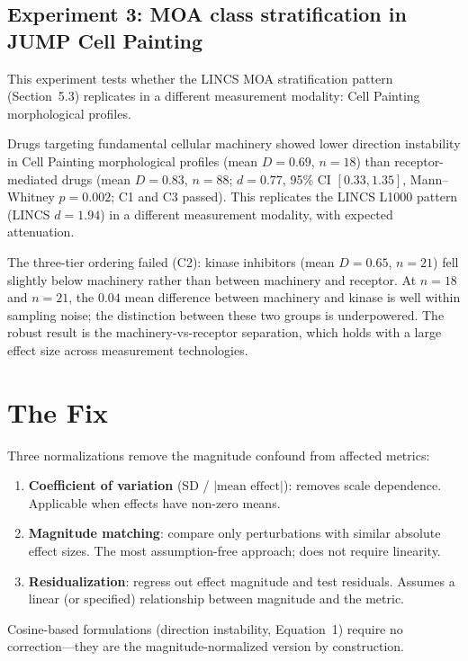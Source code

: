 \documentclass[11pt]{article}
\begin{document}
\subsection{Experiment 3: MOA class stratification in JUMP Cell Painting}

This experiment tests whether the LINCS MOA stratification pattern
(Section~5.3) replicates in a different measurement modality: Cell
Painting morphological profiles.

Drugs targeting fundamental cellular machinery showed lower direction
instability in Cell Painting morphological profiles (mean $D = 0.69$,
$n = 18$) than receptor-mediated drugs (mean $D = 0.83$, $n = 88$;
$d = 0.77$, 95\% CI $[0.33, 1.35]$, Mann--Whitney $p = 0.002$; C1 and C3 passed). This
replicates the LINCS L1000 pattern (LINCS $d = 1.94$) in a different
measurement modality, with expected attenuation.

The three-tier ordering failed (C2): kinase inhibitors (mean $D = 0.65$,
$n = 21$) fell slightly below machinery rather than between machinery
and receptor. At $n = 18$ and $n = 21$, the $0.04$ mean difference
between machinery and kinase is well within sampling noise; the
distinction between these two groups is underpowered. The robust result
is the machinery-vs-receptor separation, which holds with a large
effect size across measurement technologies.

\section{The Fix}

Three normalizations remove the magnitude confound from affected
metrics:

\begin{enumerate}
  \item \textbf{Coefficient of variation} (SD / $|\text{mean effect}|$):
    removes scale dependence. Applicable when effects have non-zero means.
  \item \textbf{Magnitude matching}: compare only perturbations with
    similar absolute effect sizes. The most assumption-free approach; does
    not require linearity.
  \item \textbf{Residualization}: regress out effect magnitude and test
    residuals. Assumes a linear (or specified) relationship between
    magnitude and the metric.
\end{enumerate}

Cosine-based formulations (direction instability, Equation~1) require no
correction---they are the magnitude-normalized version by construction.
\end{document}
